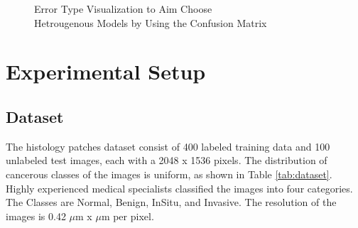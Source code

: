 \documentclass[a4paper, 12 pt, conference]{ieeeconf}
\begin{document}
\begin{figure}[htbp]
    \centering
    \hfill%
    \hfill%
    \hfill%

    \caption{\small Error Type Visualization to Aim Choose \\ Hetrougenous Models by Using the Confusion Matrix}
\label{fig:hetro}
\end{figure}
%

\section{Experimental Setup}
\subsection{Dataset}
\quad The histology patches dataset consist of 400 labeled training data and 100 unlabeled test images, each with a 2048 x 1536 pixels. The distribution of cancerous classes of the images is uniform, as shown in Table \ref{tab:dataset}. Highly experienced medical specialists classified the images into four categories. The Classes are Normal, Benign, InSitu, and Invasive. The resolution of the images is 0.42 $\mu$m x $\mu$m per pixel.
\end{document}
